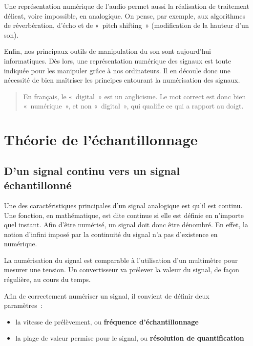 \documentclass[
  letterpaper,
  DIV=11,
  numbers=noendperiod]{scrreprt}
\providecommand{\tightlist}{%
  \setlength{\itemsep}{0pt}\setlength{\parskip}{0pt}}\usepackage{longtable,booktabs,array}
\begin{document}
Une représentation numérique de l'audio permet aussi la réalisation de
traitement délicat, voire impossible, en analogique. On pense, par
exemple, aux algorithmes de réverbération, d'écho et de «~pitch
shifting~» (modification de la hauteur d'un son).

Enfin, nos principaux outils de manipulation du son sont aujourd'hui
informatiques. Dès lors, une représentation numérique des signaux est
toute indiquée pour les manipuler grâce à nos ordinateurs. Il en découle
donc une nécessité de bien maîtriser les principes entourant la
numérisation des signaux.

\begin{quote}
En français, le «~digital~» est un anglicisme. Le mot correct est donc
bien «~numérique~», et non «~digital~», qui qualifie ce qui a rapport au
doigt.
\end{quote}

\hypertarget{thuxe9orie-de-luxe9chantillonnage}{%
\section{Théorie de
l'échantillonnage}\label{thuxe9orie-de-luxe9chantillonnage}}

\hypertarget{dun-signal-continu-vers-un-signal-uxe9chantillonnuxe9}{%
\subsection{D'un signal continu vers un signal
échantillonné}\label{dun-signal-continu-vers-un-signal-uxe9chantillonnuxe9}}

Une des caractéristiques principales d'un signal analogique est qu'il
est continu. Une fonction, en mathématique, est dite continue si elle
est définie en n'importe quel instant. Afin d'être numérisé, un signal
doit donc être dénombré. En effet, la notion d'infini imposé par la
continuité du signal n'a pas d'existence en numérique.

La numérisation du signal est comparable à l'utilisation d'un multimètre
pour mesurer une tension. Un convertisseur va prélever la valeur du
signal, de façon régulière, au cours du temps.

Afin de correctement numériser un signal, il convient de définir deux
paramètres~:

\begin{itemize}
\tightlist
\item
  la vitesse de prélèvement, ou \textbf{fréquence d'échantillonnage}
\item
  la plage de valeur permise pour le signal, ou \textbf{résolution de
  quantification}
\end{itemize}
\end{document}
